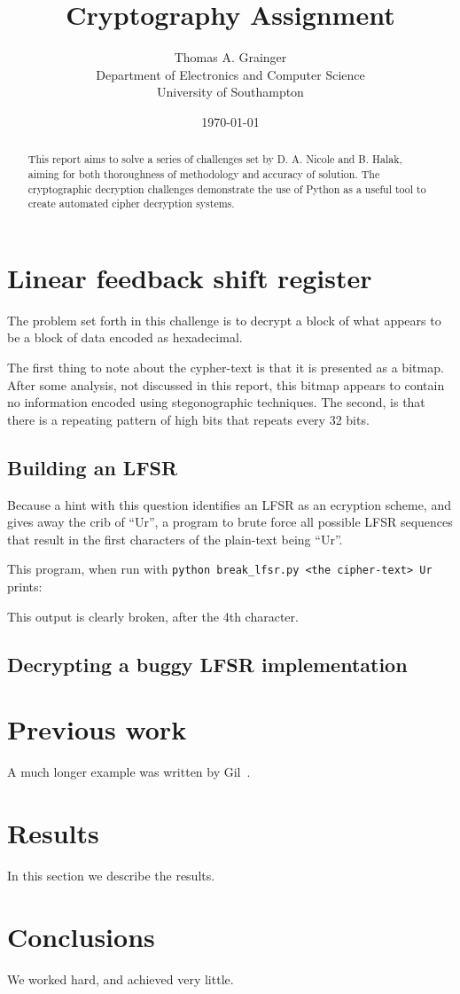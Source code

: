 \documentclass[pdftex, 12pt, a4paper]{article}
\title{Cryptography Assignment}
\author{
        Thomas A. Grainger \\
                Department of Electronics and Computer Science\\
        University of Southampton\\
}
\date{\today}
\begin{document}
\maketitle

\begin{abstract}
This report aims to solve a series of challenges set by D. A. Nicole and B. Halak\cite{instructions}, aiming for both thoroughness of methodology and accuracy of solution.  The cryptographic decryption challenges demonstrate the use of Python as a useful tool to create automated cipher decryption systems.
\end{abstract}

\tableofcontents

\section{Linear feedback shift register}

The problem set forth in this challenge is to decrypt a block of what appears to be a block of data encoded as hexadecimal.

The first thing to note about the cypher-text is that it is presented as a bitmap. After some analysis, not discussed in this report, this bitmap appears to contain no information encoded using stegonographic techniques.  The second, is that there is a repeating pattern of high bits that repeats every 32 bits.

\subsection{Building an LFSR}
Because a hint with this question identifies an LFSR as an ecryption scheme, and gives away the crib of ``Ur'', a program to brute force all possible LFSR sequences that result in the first characters of the plain-text being ``Ur''.



This program, when run with \verb`python break_lfsr.py <the cipher-text> Ur` prints:

%

This output is clearly broken, after the 4th character.

\subsection{Decrypting a buggy LFSR implementation}

\section{Previous work}\label{previous work}
A much longer \LaTeXe{} example was written by Gil~\cite{Gil:02}.

\section{Results}\label{results}
In this section we describe the results.

\section{Conclusions}\label{conclusions}
We worked hard, and achieved very little.



\end{document}
